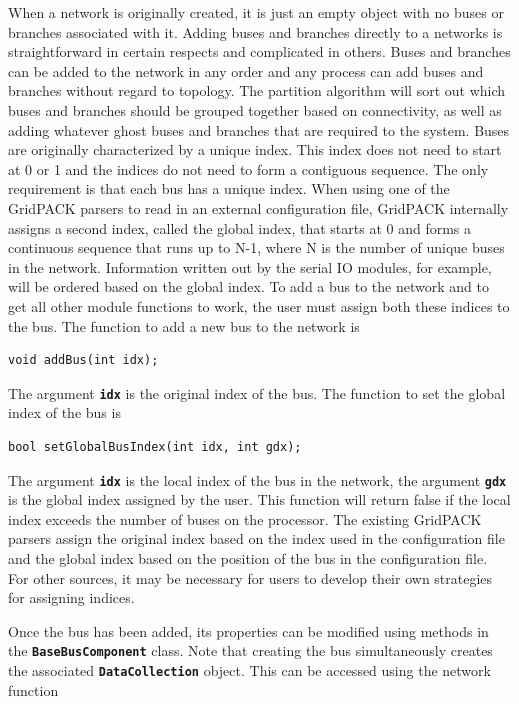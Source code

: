 \documentclass[12pt]{report} %
\begin{document}
When a network is originally created, it is just an empty object with no buses or branches associated with it. Adding buses and branches directly to a networks is straightforward in certain respects and complicated in others. Buses and branches can be added to the network in any order and any process can add buses and branches without regard to topology. The partition algorithm will sort out which buses and branches should be grouped together based on connectivity, as well as adding whatever ghost buses and branches that are required to the system. Buses are originally characterized by a unique index. This index does not need to start at 0 or 1 and the indices do not need to form a contiguous sequence. The only requirement is that each bus has a unique index. When using one of the GridPACK parsers to read in an external configuration file, GridPACK internally assigns a second index, called the global index, that starts at 0 and forms a continuous sequence that runs up to N-1, where N is the number of unique buses in the network. Information written out by the serial IO modules, for example, will be ordered based on the global index. To add a bus to the network and to get all other module functions to work, the user must assign both these indices to the bus. The function to add a new bus to the network is

{
\color{red}
\begin{Verbatim}[fontseries=b]
void addBus(int idx);
\end{Verbatim}
}

The argument \texttt{\textbf{idx}} is the original index of the bus. The function to set the global index of the bus is

{
\color{red}
\begin{Verbatim}[fontseries=b]
bool setGlobalBusIndex(int idx, int gdx);
\end{Verbatim}
}

The argument \texttt{\textbf{idx}} is the local index of the bus in the network, the argument \texttt{\textbf{gdx}} is the global index assigned by the user. This function will return false if the local index exceeds the number of buses on the processor. The existing GridPACK parsers assign the original index based on the index used in the configuration file and the global index based on the position of the bus in the configuration file. For other sources, it may be necessary for users to develop their own strategies for assigning indices.

Once the bus has been added, its properties can be modified using methods in the \texttt{\textbf{BaseBusComponent}} class. Note that creating the bus simultaneously creates the associated \texttt{\textbf{DataCollection}} object. This can be accessed using the network function
\end{document}
